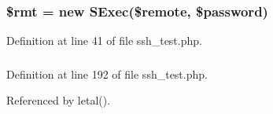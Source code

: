 \subsubsection{\setlength{\rightskip}{0pt plus 5cm}\$rmt = new SExec(\$remote, \$password)}\label{ssh__test_8php_a1}




Definition at line 41 of file ssh\_\-test.php.
\subsubsection{}\label{ssh__test_8php_a2}




Definition at line 192 of file ssh\_\-test.php.

Referenced by letal().